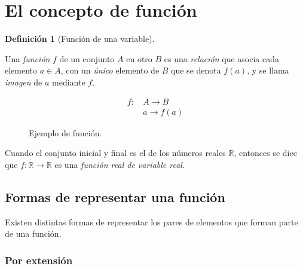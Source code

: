\documentclass[
  a4paper,
]{scrreport}
\theoremstyle{plain}
\theoremstyle{plain}
\theoremstyle{definition}
\newtheorem{definition}{Definición}[chapter]
\theoremstyle{plain}
\theoremstyle{definition}
\theoremstyle{remark}
\begin{document}
\hypertarget{el-concepto-de-funciuxf3n}{%
\section{El concepto de función}\label{el-concepto-de-funciuxf3n}}

\leavevmode{}%
\begin{definition}[Función de una variable]\label{def-funcion-real}

Una \emph{función} \(f\) de un conjunto \(A\) en otro \(B\) es una
\emph{relación} que asocia cada elemento \(a\in A\), con un \emph{único}
elemento de \(B\) que se denota \(f(a)\), y se llama \emph{imagen} de
\(a\) mediante \(f\).

\begin{align*}
f:\,&A\longrightarrow B\\
&a\longrightarrow f(a)
\end{align*}

\end{definition}

\begin{figure}

{\centering 



}

\caption{Ejemplo de función.}

\end{figure}

Cuando el conjunto inicial y final es el de los números reales
\(\mathbb{R}\), entonces se dice que
\(f:\mathbb{R}\rightarrow \mathbb{R}\) es una \emph{función real de
variable real}.

\hypertarget{formas-de-representar-una-funciuxf3n}{%
\subsection{Formas de representar una
función}\label{formas-de-representar-una-funciuxf3n}}

Existen distintas formas de representar los pares de elementos que
forman parte de una función.

\hypertarget{por-extensiuxf3n}{%
\subsubsection*{Por extensión}\label{por-extensiuxf3n}}
\end{document}
